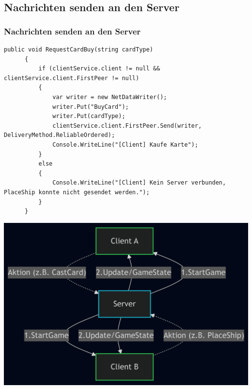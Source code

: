 \documentclass{beamer}
\begin{document}
\subsection{Nachrichten senden an den Server}
\begin{frame}[fragile]
\frametitle{Nachrichten senden an den Server}
  \begin{lstlisting}[language=CSharp, basicstyle=\ttfamily\tiny, breaklines=true]
    public void RequestCardBuy(string cardType)
      {
          if (clientService.client != null && clientService.client.FirstPeer != null)
          {
              var writer = new NetDataWriter();
              writer.Put("BuyCard");
              writer.Put(cardType);
              clientService.client.FirstPeer.Send(writer, DeliveryMethod.ReliableOrdered);
              Console.WriteLine("[Client] Kaufe Karte");
          }
          else
          {
              Console.WriteLine("[Client] Kein Server verbunden, PlaceShip konnte nicht gesendet werden.");
          }
      }
  \end{lstlisting}
\end{frame}
\begin{frame}[fragile]

\includegraphics[width=\textwidth]{EDA.png}
\end{frame}
\end{document}
